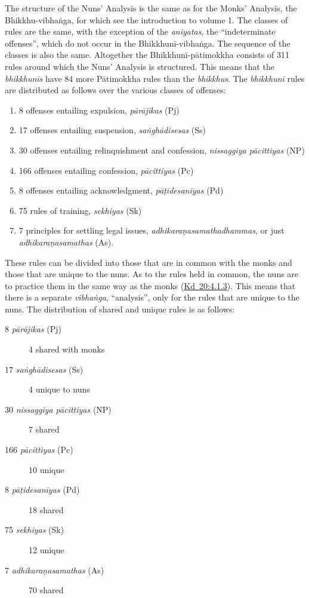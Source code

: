 \documentclass[12pt,openany]{book}%
\begin{document}
The structure of the Nuns’ Analysis is the same as for the Monks’ Analysis, the Bhikkhu-\textsanskrit{vibhaṅga}, for which see the introduction to volume 1. The classes of rules are the same, with the exception of the \textit{aniyatas}, the “indeterminate offenses”, which do not occur in the \textsanskrit{Bhikkhunī}-\textsanskrit{vibhaṅga}. The sequence of the classes is also the same. Altogether the \textsanskrit{Bhikkhunī}-\textsanskrit{pātimokkha} consists of 311 rules around which the Nuns’ Analysis is structured. This means that the \textit{\textsanskrit{bhikkhunīs}} have 84 more \textsanskrit{Pātimokkha} rules than the \textit{bhikkhus}. The \textit{\textsanskrit{bhikkhunī}} rules are distributed as follows over the various classes of offenses:

\begin{enumerate}%
\item 8 offenses entailing expulsion, \textit{\textsanskrit{pārājikas}} (Pj)%
\item 17 offenses entailing suspension, \textit{\textsanskrit{saṅghādisesas}} (Ss)%
\item 30 offenses entailing relinquishment and confession, \textit{nissaggiya \textsanskrit{pācittiyas}} (NP)%
\item 166 offenses entailing confession, \textit{\textsanskrit{pācittiyas}} (Pc)%
\item 8 offenses entailing acknowledgment, \textit{\textsanskrit{pāṭidesanīyas}} (Pd)%
\item 75 rules of training, \textit{sekhiyas} (Sk)%
\item 7 principles for settling legal issues, \textit{\textsanskrit{adhikaraṇasamathadhammas}}, or just \textit{\textsanskrit{adhikaraṇasamathas}} (As).%
\end{enumerate}

These rules can be divided into those that are in common with the monks and those that are unique to the nuns. As to the rules held in common, the nuns are to practice them in the same way as the monks (\href{https://suttacentral.net/pli-tv-kd20/en/brahmali\#4.1.3}{Kd~20:4.1.3}). This means that there is a separate \textit{\textsanskrit{vibhaṅga}}, “analysis”, only for the rules that are unique to the nuns. The distribution of shared and unique rules is as follows:

\begin{description}%
\item[8 \textit{\textsanskrit{pārājikas}} (Pj)] 4 shared with monks%
\item[17 \textit{\textsanskrit{saṅghādisesas}} (Ss)] 4 unique to nuns%
\item[30 \textit{nissaggiya \textsanskrit{pācittiyas}} (NP)] 7 shared%
\item[166 \textit{\textsanskrit{pācittiyas}} (Pc)] 10 unique%
\item[8 \textit{\textsanskrit{pāṭidesanīyas}} (Pd)] 18 shared%
\item[75 \textit{sekhiyas} (Sk)] 12 unique%
\item[7 \textit{\textsanskrit{adhikaraṇasamathas}} (As)] 70 shared%
\end{description}
\end{document}
